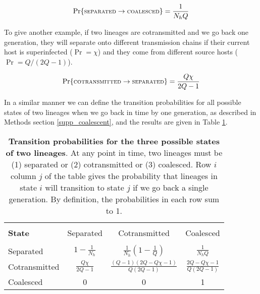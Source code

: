 \documentclass[_main.tex]{subfiles}
\begin{document}
\begin{equation*} \label{eq:coal3}
\Pr \{ \textsc{\small{separated}} \rightarrow \textsc{\small{coalesced}} \} 
= \frac{1}{N_hQ}
\end{equation*}

To give another example, if two lineages are cotransmitted and we go back one generation, they will separate onto different transmission chains if their current host is superinfected ($\Pr = \chi$) and they come from different source hosts ($\Pr = Q/(2Q-1)$).

\begin{equation*} \label{eq:coal4}
\Pr \{ \textsc{\small{cotransmitted}} \rightarrow \textsc{\small{separated}} \} 
= \frac{Q\chi}{2Q-1}
\end{equation*}

In a similar manner we can define the transition probabilities for all possible states of two lineages when we go back in time by one generation, as described in Methods section \ref{supp_coalescent}, and the results are given in Table \ref{tab:main_tr_matrix}.

\renewcommand\theadalign{bc} 

\begin{table}[htb] 
\centering
\large{
\begin{tabular}{l | c c c } 
\hline \\
\textbf{\small{State}} & \small{Separated} & \small{Cotransmitted} & \small{Coalesced} \\ [0.5ex] 
\hline \\
\small{Separated} & $1 - \frac{1}{N_h}$ & $\frac{1}{N_h} (1 - \frac{1}{Q})$ 
& $\frac{1}{N_hQ}$ \\ [2ex]
\small{Cotransmitted} & $\frac{Q\chi}{2Q-1}$ & $\frac{(Q-1)(2Q - Q\chi - 1)}{Q(2Q-1)}$
& $\frac{2Q - Q\chi - 1}{Q(2Q-1)}$ \\ [2ex] 
\small{Coalesced} & 0 & 0 & 1 \\ [1ex]  
\hline
\end{tabular}
}
\caption{\small{\textbf{Transition probabilities for the three possible states of two lineages}. At any point in time, two lineages must be (1) separated or (2) cotransmitted or (3) coalesced. Row $i$ column $j$ of the table gives the probability that lineages in state $i$ will transition to state $j$ if we go back a single generation.  By definition, the probabilities in each row sum to 1.}}
\label{tab:main_tr_matrix}
\end{table}

\end{document}
